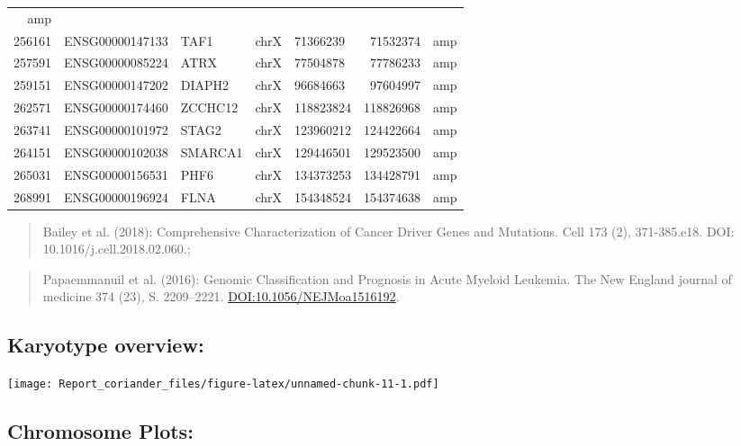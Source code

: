\documentclass[]{article}
\begin{document}
\begin{longtable}[]{@{}rrlrlrl@{}}
amp\tabularnewline
256161 & ENSG00000147133 & TAF1 & chrX & 71366239 & 71532374 &
amp\tabularnewline
257591 & ENSG00000085224 & ATRX & chrX & 77504878 & 77786233 &
amp\tabularnewline
259151 & ENSG00000147202 & DIAPH2 & chrX & 96684663 & 97604997 &
amp\tabularnewline
262571 & ENSG00000174460 & ZCCHC12 & chrX & 118823824 & 118826968 &
amp\tabularnewline
263741 & ENSG00000101972 & STAG2 & chrX & 123960212 & 124422664 &
amp\tabularnewline
264151 & ENSG00000102038 & SMARCA1 & chrX & 129446501 & 129523500 &
amp\tabularnewline
265031 & ENSG00000156531 & PHF6 & chrX & 134373253 & 134428791 &
amp\tabularnewline
268991 & ENSG00000196924 & FLNA & chrX & 154348524 & 154374638 &
amp\tabularnewline
\bottomrule
\end{longtable}

\begin{quote}
Bailey et al. (2018): Comprehensive Characterization of Cancer Driver
Genes and Mutations. Cell 173 (2), 371-385.e18. DOI:
10.1016/j.cell.2018.02.060.;
\end{quote}

\begin{quote}
Papaemmanuil et al. (2016): Genomic Classification and Prognosis in
Acute Myeloid Leukemia. The New England journal of medicine 374 (23), S.
2209--2221. \url{DOI:10.1056/NEJMoa1516192}.
\end{quote}

\hypertarget{karyotype-overview}{%
\subsection{Karyotype overview:}\label{karyotype-overview}}

\texttt{[image: Report\_coriander\_files/figure-latex/unnamed-chunk-11-1.pdf]}

\hypertarget{chromosome-plots}{%
\subsection{Chromosome Plots:}\label{chromosome-plots}}
\end{document}
